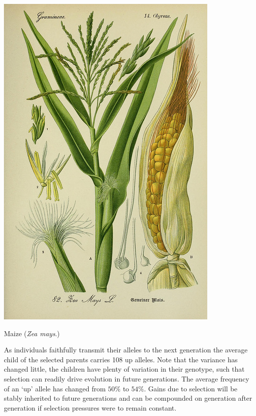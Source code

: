  \begin{marginfigure}[4cm]
 \begin{center}
   \includegraphics[width = 0.7 \textwidth]{illustration_images/Genetic_drift/maize/7845339168_66aa3d8ccc_z.jpg}
 \end{center}
 \caption{Maize ({\it Zea mays}.) } \label{fig:maize}  %
 \end{marginfigure}  %

 As individuals
 faithfully transmit their alleles to the next generation the average
 child of the selected parents carries 108 up alleles. Note that the
 variance has changed little, the children have plenty of variation in
 their genotype, such that selection can readily drive evolution in future generations. The average frequency of an `up' allele has changed
 from $50\%$ to $54\%$. Gains due to selection will be stably
 inherited to future generations and can be compounded on generation
 after generation if selection pressures were to remain constant.



